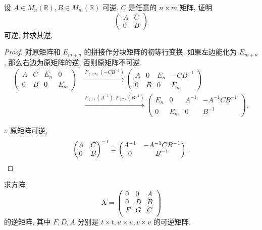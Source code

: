 \documentclass{ctexart}
\begin{document}
\begin{exercisec}[第 3 章的习题 3.9]
    设 $A\in M_n(\mathbb{R}),B\in M_m(\mathbb{R})$ 可逆, $C$ 是任意的 $n\times m$ 矩阵, 证明
    \[\begin{pmatrix}
        A & C \\
        0 & B
    \end{pmatrix}\]
    可逆, 并求其逆.
\end{exercisec}
\begin{proof}
    对原矩阵和 $E_{m+n}$ 的拼接作分块矩阵的初等行变换, 如果左边能化为 $E_{m+n}$, 那么右边为原矩阵的逆, 否则原矩阵不可逆.
    \begin{align*}
        \left(\begin{array}{cc|cc}
            A & C & E_n & 0 \\
            0 & B & 0 & E_m
        \end{array}\right) & \xrightarrow{F_{(1,2)}(-CB^{-1})}\left(\begin{array}{cc|cc}
            A & 0 & E_n & -CB^{-1} \\
            0 & B & 0 & E_m
        \end{array}\right) \\
        & \xrightarrow{F_{(1)}(A^{-1}),F_{(2)}(B^{-1})}\left(\begin{array}{cc|cc}
            E_n & 0 & A^{-1} & -A^{-1}CB^{-1} \\
            0 & E_m & 0 & B^{-1}
        \end{array}\right),
    \end{align*}

    $\therefore$ 原矩阵可逆,
    \[\begin{pmatrix}
        A & C \\
        0 & B
    \end{pmatrix}^{-1}=\begin{pmatrix}
        A^{-1} & -A^{-1}CB^{-1} \\
        0 & B^{-1}
    \end{pmatrix}.\qedhere\]
\end{proof}
\begin{exercisec}[3.4.7(2)]
    求方阵
    \[X=\begin{pmatrix}
        0 & 0 & A \\
        0 & D & B \\
        F & G & C \\
    \end{pmatrix}\]
    的逆矩阵, 其中 $F,D,A$ 分别是 $t\times t,u\times u,v\times v$ 的可逆矩阵.
\end{exercisec}
\end{document}

